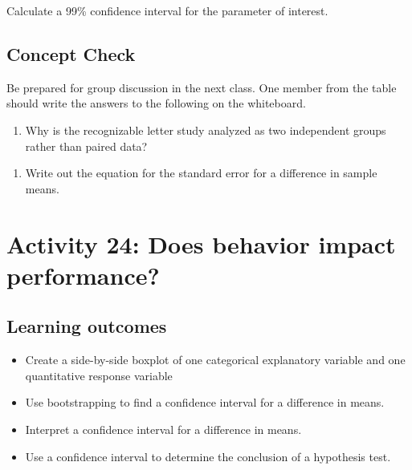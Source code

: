 \documentclass[
]{report}
\providecommand{\tightlist}{%
  \setlength{\itemsep}{0pt}\setlength{\parskip}{0pt}}
\begin{document}
Calculate a 99\% confidence interval for the parameter of interest.

\vspace{0.6in}

\subsection{Concept Check}\label{concept-check-1}

Be prepared for group discussion in the next class. One member from the table should write the answers to the following on the whiteboard.

\begin{enumerate}
\def\labelenumi{\arabic{enumi}.}
\tightlist
\item
  Why is the recognizable letter study analyzed as two independent groups rather than paired data?
\end{enumerate}

\vspace{0.6in}

\begin{enumerate}
\def\labelenumi{\arabic{enumi}.}
\setcounter{enumi}{1}
\tightlist
\item
  Write out the equation for the standard error for a difference in sample means.
\end{enumerate}

\vspace{1in}

\newpage

\section{Activity 24: Does behavior impact performance?}\label{activity-24-does-behavior-impact-performance}


\subsection{Learning outcomes}\label{learning-outcomes-4}

\begin{itemize}
\tightlist
\item
  Create a side-by-side boxplot of one categorical explanatory variable and one quantitative response variable
\end{itemize}

\begin{itemize}
\item
  Use bootstrapping to find a confidence interval for a difference in means.
\item
  Interpret a confidence interval for a difference in means.
\item
  Use a confidence interval to determine the conclusion of a hypothesis test.
\end{itemize}
\end{document}
